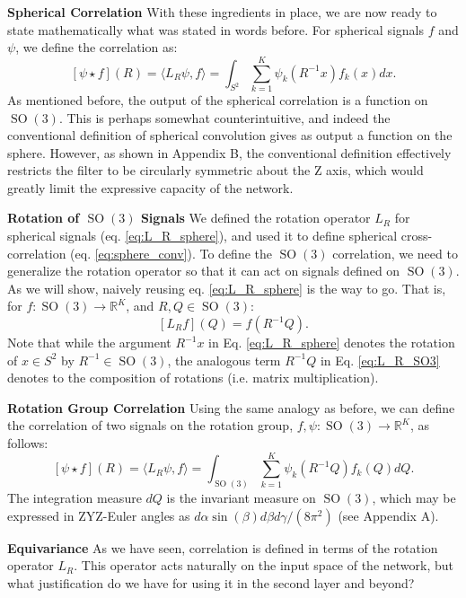 \documentclass{article} %
\newcommand{\R}{\mathbb{R}}
\newcommand{\SO}[1]{\ensuremath{\operatorname{SO}(#1)}}
\begin{document}
{\bf Spherical Correlation}
With these ingredients in place, we are now ready to state mathematically what was stated in words before.
For spherical signals $f$ and $\psi$, we define the correlation as:
\begin{equation}
  \label{eq:sphere_conv}
  [\psi \star f](R) = \langle L_R \psi, f \rangle = \int_{S^2} \sum_{k=1}^K \psi_k(R^{-1} x) f_k(x) dx.
\end{equation}
As mentioned before, the output of the spherical correlation is a function on $\SO3$.
This is perhaps somewhat counterintuitive, and indeed the conventional definition of spherical convolution gives as output a function on the sphere.
However, as shown in Appendix B, the conventional definition effectively restricts the filter to be circularly symmetric about the Z axis, which would greatly limit the expressive capacity of the network.

{\bf Rotation of $\SO3$ Signals}
We defined the rotation operator $L_R$ for spherical signals (eq. \ref{eq:L_R_sphere}), and used it to define spherical cross-correlation (eq. \ref{eq:sphere_conv}).
To define the $\SO3$ correlation, we need to generalize the rotation operator so that it can act on signals defined on $\SO3$.
As we will show, naively reusing eq. \ref{eq:L_R_sphere} is the way to go.
That is, for $f : \SO3 \rightarrow \R^K$, and $R, Q \in \SO3$:
\begin{equation}
    \label{eq:L_R_SO3}
    [L_R f](Q) = f(R^{-1} Q).
\end{equation}
Note that while the argument $R^{-1}x$ in Eq. \ref{eq:L_R_sphere} denotes the rotation of $x \in S^2$ by $R^{-1} \in \SO3$, the analogous term $R^{-1} Q$ in Eq. \ref{eq:L_R_SO3} denotes to the composition of rotations (i.e. matrix multiplication).


{\bf Rotation Group Correlation}
Using the same analogy as before, we can define the correlation of two signals on the rotation group, $f, \psi : \SO3 \rightarrow \R^K$, as follows:
\begin{equation}
  \label{eq:SO3_conv}
  [\psi \star f](R) = \langle L_R \psi, f \rangle = \int_{\SO3} \sum_{k=1}^K \psi_k(R^{-1} Q) f_k(Q) dQ.
\end{equation}
The integration measure $dQ$ is the invariant measure on $\SO3$, which may be expressed in ZYZ-Euler angles as $d\alpha \sin(\beta) d\beta d\gamma / (8 \pi^2)$ (see Appendix A).


{\bf Equivariance}
As we have seen, correlation is defined in terms of the rotation operator $L_R$.
This operator acts naturally on the input space of the network, but what justification do we have for using it in the second layer and beyond?
\end{document}
